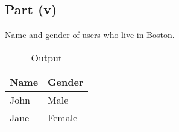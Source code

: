 \documentclass{article}
\begin{document}
\subsection{Part (v)}
Name and gender of users who live in Boston.

\begin{table}[ht]
  \centering
  \begin{center}
  \begin{tabular}{|C{3cm}|C{3cm}|}
  \hline
  \textbf{Name} & \textbf{Gender} \\ \hline 
  John        & Male   \\   \hline
  Jane        & Female \\   \hline
  \end{tabular}
\end{center}
\caption{Output}
\end{table}
\end{document}
